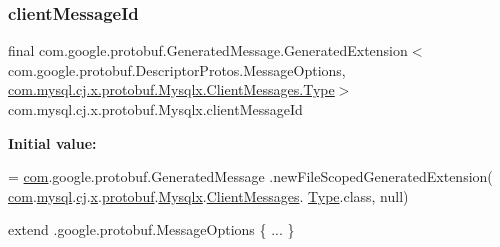 \mbox{\label{classcom_1_1mysql_1_1cj_1_1x_1_1protobuf_1_1_mysqlx_a51cf8a943a8b670b469c2ec2726222a0}} 
\subsubsection{\texorpdfstring{client\+Message\+Id}{clientMessageId}}
{\footnotesize\ttfamily final com.\+google.\+protobuf.\+Generated\+Message.\+Generated\+Extension$<$ com.\+google.\+protobuf.\+Descriptor\+Protos.\+Message\+Options, \mbox{\hyperlink{enumcom_1_1mysql_1_1cj_1_1x_1_1protobuf_1_1_mysqlx_1_1_client_messages_1_1_type}{com.\+mysql.\+cj.\+x.\+protobuf.\+Mysqlx.\+Client\+Messages.\+Type}}$>$ com.\+mysql.\+cj.\+x.\+protobuf.\+Mysqlx.\+client\+Message\+Id\hspace{0.3cm}{\ttfamily [static]}}

{\bfseries Initial value\+:}
\begin{DoxyCode}
= \mbox{\hyperlink{namespacecom}{com}}.google.protobuf.GeneratedMessage
          .newFileScopedGeneratedExtension(
        \mbox{\hyperlink{namespacecom}{com}}.\mbox{\hyperlink{namespacecom_1_1mysql}{mysql}}.\mbox{\hyperlink{namespacecom_1_1mysql_1_1cj}{cj}}.\mbox{\hyperlink{namespacecom_1_1mysql_1_1cj_1_1x}{x}}.\mbox{\hyperlink{namespacecom_1_1mysql_1_1cj_1_1x_1_1protobuf}{protobuf}}.\mbox{\hyperlink{classcom_1_1mysql_1_1cj_1_1x_1_1protobuf_1_1_mysqlx}{Mysqlx}}.\mbox{\hyperlink{classcom_1_1mysql_1_1cj_1_1x_1_1protobuf_1_1_mysqlx_1_1_client_messages}{ClientMessages}}.
      \mbox{\hyperlink{enumcom_1_1mysql_1_1cj_1_1x_1_1protobuf_1_1_mysqlx_1_1_client_messages_1_1_type}{Type}}.class,
        null)
\end{DoxyCode}
{\ttfamily extend .google.\+protobuf.\+Message\+Options \{ ... \}} \mbox{\label{classcom_1_1mysql_1_1cj_1_1x_1_1protobuf_1_1_mysqlx_aa7289b91ec6f2fb3f9094f456796995c}} 
